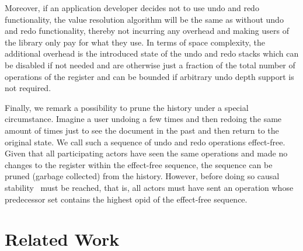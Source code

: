\documentclass[sigplan,natbib=false,review]{acmart}
\begin{document}
Moreover, if an application developer decides not to use undo and redo functionality,
the value resolution algorithm will be the same as without undo and redo functionality,
thereby not incurring any overhead and making users of the library only
pay for what they use.
In terms of space complexity, the additional overhead is the introduced state
of the undo and redo stacks which can be disabled if not needed and are otherwise
just a fraction of the total number of operations of the register and can be
bounded if arbitrary undo depth support is not required.

Finally, we remark a possibility to prune the history under a special circumstance.
Imagine a user undoing a few times and then redoing the same amount of times
just to see the document in the past and then return to the original state.
We call such a sequence of undo and redo operations effect-free.
Given that all participating actors have seen the same operations and made no
changes to the register within the effect-free sequence,
the sequence can be pruned (garbage collected) from the history.
However, before doing so causal stability~\cite{baquero2017pure}
must be reached, that is, all
actors must have sent an operation whose predecessor set contains the
highest \gls*{opid} of the effect-free sequence.

\section{Related Work}\label{sec:related-work}

\end{document}
